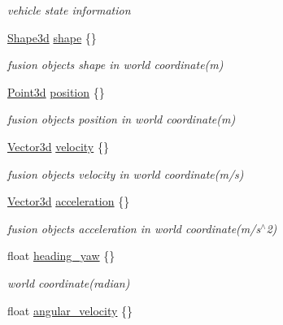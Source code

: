 \begin{DoxyCompactItemize}
\begin{DoxyCompactList}\small\item\em vehicle state information \end{DoxyCompactList}\item 
\hyperlink{structmaf__perception__interface_1_1Shape3d}{Shape3d} \hyperlink{structmaf__perception__interface_1_1PerceptionFusionObjectData_a74b50d39e755ffc4cdb0ad8b33dbef8b}{shape} \{\}
\begin{DoxyCompactList}\small\item\em fusion objects shape in world coordinate(m) \end{DoxyCompactList}\item 
\hyperlink{structmaf__perception__interface_1_1Point3d}{Point3d} \hyperlink{structmaf__perception__interface_1_1PerceptionFusionObjectData_a5fb6c92ffe11fb186cf2fb2c4d6537aa}{position} \{\}
\begin{DoxyCompactList}\small\item\em fusion objects position in world coordinate(m) \end{DoxyCompactList}\item 
\hyperlink{structmaf__perception__interface_1_1Vector3d}{Vector3d} \hyperlink{structmaf__perception__interface_1_1PerceptionFusionObjectData_a26935c37590d0d739ea29755d41e9502}{velocity} \{\}
\begin{DoxyCompactList}\small\item\em fusion objects velocity in world coordinate(m/s) \end{DoxyCompactList}\item 
\hyperlink{structmaf__perception__interface_1_1Vector3d}{Vector3d} \hyperlink{structmaf__perception__interface_1_1PerceptionFusionObjectData_a87b0856f76006c29c3bda15294dde594}{acceleration} \{\}
\begin{DoxyCompactList}\small\item\em fusion objects acceleration in world coordinate(m/s$^\wedge$2) \end{DoxyCompactList}\item 
float \hyperlink{structmaf__perception__interface_1_1PerceptionFusionObjectData_a9f15d9ba0b355185f3e3faa0fbc3b672}{heading\+\_\+yaw} \{\}
\begin{DoxyCompactList}\small\item\em world coordinate(radian) \end{DoxyCompactList}\item 
float \hyperlink{structmaf__perception__interface_1_1PerceptionFusionObjectData_a1b7de8c10ac6ab4b7b4be10200044dd0}{angular\+\_\+velocity} \{\}

\end{DoxyCompactItemize}

